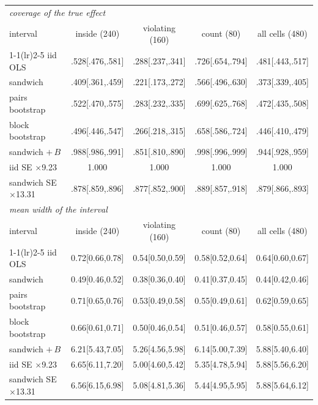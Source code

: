 \footnotesize\setlength{\tabcolsep}{2.4pt}
\begin{tabular}{lcccc}
\toprule
\multicolumn{5}{l}{\emph{coverage of the true effect}} \\
interval & inside (240) & violating (160) & count (80) & all cells (480) \\
\cmidrule(lr){1-1}\cmidrule(lr){2-5}
iid OLS & .528[.476,.581] & .288[.237,.341] & .726[.654,.794] & .481[.443,.517] \\
sandwich & .409[.361,.459] & .221[.173,.272] & .566[.496,.630] & .373[.339,.405] \\
pairs bootstrap & .522[.470,.575] & .283[.232,.335] & .699[.625,.768] & .472[.435,.508] \\
block bootstrap & .496[.446,.547] & .266[.218,.315] & .658[.586,.724] & .446[.410,.479] \\
sandwich $+\,B$ & .988[.986,.991] & .851[.810,.890] & .998[.996,.999] & .944[.928,.959] \\
\addlinespace[1pt]
iid SE $\times$9.23 & 1.000 & 1.000 & 1.000 & 1.000 \\
sandwich SE $\times$13.31 & .878[.859,.896] & .877[.852,.900] & .889[.857,.918] & .879[.866,.893] \\
\midrule
\multicolumn{5}{l}{\emph{mean width of the interval}} \\
interval & inside (240) & violating (160) & count (80) & all cells (480) \\
\cmidrule(lr){1-1}\cmidrule(lr){2-5}
iid OLS & 0.72[0.66,0.78] & 0.54[0.50,0.59] & 0.58[0.52,0.64] & 0.64[0.60,0.67] \\
sandwich & 0.49[0.46,0.52] & 0.38[0.36,0.40] & 0.41[0.37,0.45] & 0.44[0.42,0.46] \\
pairs bootstrap & 0.71[0.65,0.76] & 0.53[0.49,0.58] & 0.55[0.49,0.61] & 0.62[0.59,0.65] \\
block bootstrap & 0.66[0.61,0.71] & 0.50[0.46,0.54] & 0.51[0.46,0.57] & 0.58[0.55,0.61] \\
sandwich $+\,B$ & 6.21[5.43,7.05] & 5.26[4.56,5.98] & 6.14[5.00,7.39] & 5.88[5.40,6.40] \\
\addlinespace[1pt]
iid SE $\times$9.23 & 6.65[6.11,7.20] & 5.00[4.60,5.42] & 5.35[4.78,5.94] & 5.88[5.56,6.20] \\
sandwich SE $\times$13.31 & 6.56[6.15,6.98] & 5.08[4.81,5.36] & 5.44[4.95,5.95] & 5.88[5.64,6.12] \\
\bottomrule
\end{tabular}
